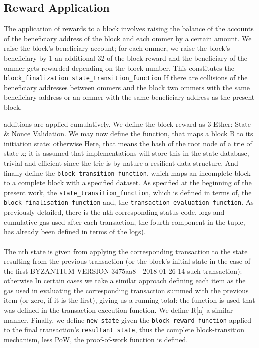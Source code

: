 \documentclass[10pt,letterpaper,leqno,bibliography=totoc]{scrartcl}
\newenvironment{alphafootnotes}
{\par\edef\savedfootnotenumber{\number\value{footnote}}
\renewcommand{\thefootnote}{\alph{footnote}}
\setcounter{footnote}{0}}
{\par\setcounter{footnote}{\savedfootnotenumber}}
\begin{document}
\begin{alphafootnotes}
\begin{multicols*}{2}
		\subsection{Reward Application} The application of rewards to a block involves raising the balance of the accounts of the beneficiary address of the block and each ommer by a certain amount. We raise the block’s beneficiary account; for each ommer, we raise the block’s beneficiary by 1 an additional 32 of the block reward and the beneficiary of the ommer gets rewarded depending on the block number. This constitutes the \texttt{block\_finalization state\_transition\_function} If there are collisions of the beneficiary addresses between ommers and the block two ommers with the same beneficiary address or an ommer with the same beneficiary address as the present block,

			additions are applied cumulatively. We define the block reward as 3 Ether: State \& Nonce Validation. We may now define the function, that maps a block B to its initiation state: otherwise Here, that means the hash of the root node of a trie of state x; it is assumed that implementations will store this in the state database, trivial and efficient since the trie is by nature a resilient data structure. And finally define the \texttt{block\_transition\_function}, which maps an incomplete block to a complete block with a specified dataset. As specified at the beginning of the present work, the \texttt{state\_transition\_function}, which is defined in terms of, the \texttt{block\_finalisation\_function} and, the \texttt{transaction\_evaluation\_function}. As previously detailed, there is the nth corresponding status code, logs and cumulative gas used after each transaction, the fourth component in the tuple, has already been defined in terms of the logs). 
		\paragraph{}The nth state is given from applying the corresponding transaction to the state resulting from the previous transaction (or the block’s initial state in the case of the first BYZANTIUM VERSION 3475aa8 - 2018-01-26 14 such transaction): otherwise In certain cases we take a similar approach defining each item as the gas used in evaluating the corresponding transaction summed with the previous item (or zero, if it is the first), giving us a running total: the function is used that was defined in the transaction execution function. We define R[n] a similar manner. Finally, we define \texttt{new state} given the \texttt{block reward function} applied to the final transaction’s \texttt{resultant state}, thus the complete block-transition mechanism, less PoW, the proof-of-work function is defined. 
		

\end{multicols*}
\end{alphafootnotes}
\end{document}
